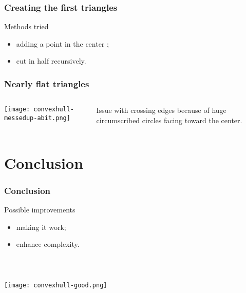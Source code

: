 \documentclass{beamer}
\begin{document}
	\begin{frame}
		\frametitle{Creating the first triangles}
		\begin{block}{Methods tried}
			\begin{itemize}
				\item adding a point in the center ;
				\item cut in half recursively.
			\end{itemize}
		\end{block}
	\end{frame}
	
	\begin{frame}
		\frametitle{Nearly flat triangles}
		\begin{columns}[T]
			\begin{column}{.5\textwidth}
				\hspace*{0cm} \texttt{[image: convexhull-messedup-abit.png]} \hspace*{\fill}
			\end{column}
			\begin{column}{.45\textwidth}
				Issue with crossing edges because of huge circumscribed circles facing toward the center.
			\end{column}
		\end{columns}
	\end{frame}

	
	\section*{Conclusion}
	\begin{frame}
		\frametitle{Conclusion}
		\begin{block}{Possible improvements}
			\begin{itemize}
				\item making it work;
				\item enhance complexity.
			\end{itemize}
		\end{block}
	\end{frame}
	
	
	\begin{frame}
		\frametitle{~}
		\begin{center}
			\texttt{[image: convexhull-good.png]}
		\end{center}
	\end{frame}
\end{document}
